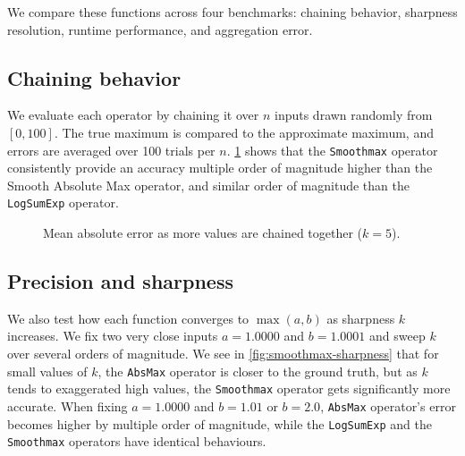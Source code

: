 We compare these functions across four benchmarks: chaining behavior, sharpness resolution, runtime performance, and aggregation error.

\subsection*{Chaining behavior}

We evaluate each operator by chaining it over $n$ inputs drawn randomly from $[0, 100]$. The true maximum is compared to the approximate maximum, and errors are averaged over 100 trials per $n$. \cref{fig:smoothmax-chained-error} shows that the \texttt{Smoothmax} operator consistently provide an accuracy multiple order of magnitude higher than the Smooth Absolute Max operator, and similar order of magnitude than the \texttt{LogSumExp} operator. 

\begin{figure}
    \caption{Mean absolute error as more values are chained together ($k = 5$).}
    \label{fig:smoothmax-chained-error}
\end{figure}


\subsection*{Precision and sharpness}

We also test how each function converges to $\max(a, b)$ as sharpness $k$ increases. We fix two very close inputs $a = 1.0000$ and $b = 1.0001$ and sweep $k$ over several orders of magnitude. We see in \cref{fig:smoothmax-sharpness} that for small values of $k$, the \texttt{AbsMax} operator is closer to the ground truth, but as $k$ tends to exaggerated high values, the \texttt{Smoothmax} operator gets significantly more accurate. When fixing $a = 1.0000$ and $b = 1.01$ or $b = 2.0$, \texttt{AbsMax} operator's error becomes higher by multiple order of magnitude, while the \texttt{LogSumExp} and the \texttt{Smoothmax} operators have identical behaviours.


